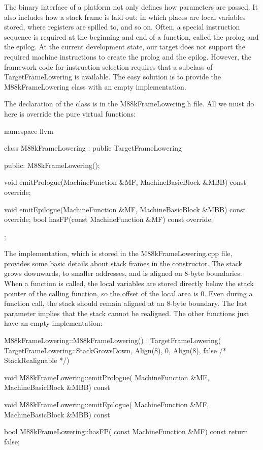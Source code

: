 The binary interface of a platform not only defines how parameters are passed. It also includes how a stack frame is laid out: in which places are local variables stored, where registers are spilled to, and so on. Often, a special instruction sequence is required at the beginning and end of a function, called the prolog and the epilog. At the current development state, our target does not support the required machine instructions to create the prolog and the epilog. However, the framework code for instruction selection requires that a subclass of TargetFrameLowering is available. The easy solution is to provide the M88kFrameLowering class with an empty implementation.

The declaration of the class is in the M88kFrameLowering.h file. All we must do here is override the pure virtual functions:

\begin{cpp}
namespace llvm {
class M88kFrameLowering : public TargetFrameLowering {
public:
    M88kFrameLowering();

    void
    emitPrologue(MachineFunction &MF,
    MachineBasicBlock &MBB) const override;

    void
    emitEpilogue(MachineFunction &MF,
                 MachineBasicBlock &MBB) const override;
    bool hasFP(const MachineFunction &MF) const override;
};
}
\end{cpp}

The implementation, which is stored in the M88kFrameLowering.cpp file, provides some basic details about stack frames in the constructor. The stack grows downwards, to smaller addresses, and is aligned on 8-byte boundaries. When a function is called, the local variables are stored directly below the stack pointer of the calling function, so the offset of the local area is 0. Even during a function call, the stack should remain aligned at an 8-byte boundary. The last parameter implies that the stack cannot be realigned. The other functions just have an empty implementation:

\begin{cpp}
M88kFrameLowering::M88kFrameLowering()
    : TargetFrameLowering(
        TargetFrameLowering::StackGrowsDown, Align(8),
        0, Align(8), false /* StackRealignable */) {}

void M88kFrameLowering::emitPrologue(
    MachineFunction &MF, MachineBasicBlock &MBB) const {}

void M88kFrameLowering::emitEpilogue(
    MachineFunction &MF, MachineBasicBlock &MBB) const {}

bool M88kFrameLowering::hasFP(
    const MachineFunction &MF) const { return false; }
\end{cpp}

